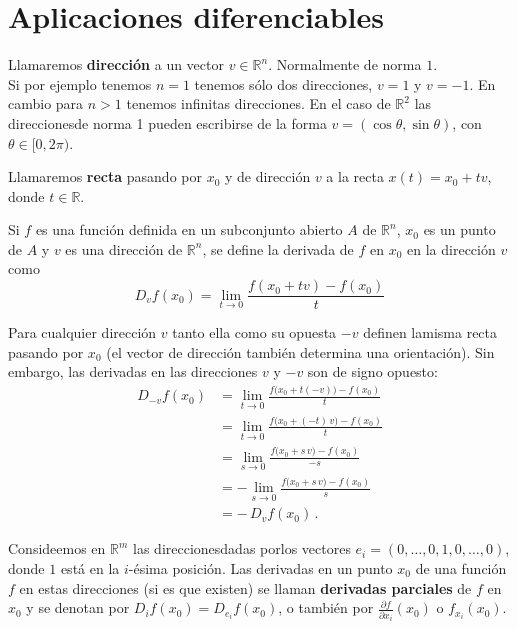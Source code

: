 \section{Aplicaciones diferenciables}
\begin{definición}[Dirección]
    Llamaremos \textbf{dirección} a un vector $v\in\mathbb{R}^n$. Normalmente de norma $1$. \\
    Si por ejemplo tenemos $n = 1$ tenemos sólo dos direcciones, $v = 1$ y $v = -1$. En cambio para $n > 1$ tenemos infinitas direcciones. En el caso de $\mathbb{R}^2$ las direccionesde norma 1 pueden escribirse de la forma $v = (\cos\theta, \sin\theta)$, con $\theta\in[0,2\pi)$. \\
\end{definición}

\begin{definición}[Recta]
    Llamaremos \textbf{recta} pasando por $x_0$ y de dirección $v$ a la recta $x(t) = x_0 + tv$, donde $t\in\mathbb{R}$. 
\end{definición}

\begin{definición}
    Si $f$ es una función definida en un subconjunto abierto $A$ de $\mathbb{R}^n$, $x_0$ es un punto de $A$ y $v$ es una dirección de $\mathbb{R}^n$, se define la derivada de $f$ en $x_0$ en la dirección $v$ como
    $$ D_vf(x_0) = \lim_{t\to 0} \frac{f(x_0 + tv) - f(x_0)}{t} $$
\end{definición}
\begin{observación}
    Para cualquier dirección $v$ tanto ella como su opuesta $-v$ definen lamisma recta pasando por $x_0$ (el vector de dirección también determina una orientación). Sin embargo, las derivadas en las direcciones $v$ y $-v$ son de signo opuesto: 
    \begin{align*}
        D_{-v}f(x_{0})
        &= \lim_{t \to 0} \frac{f\bigl(x_{0} + t(-v)\bigr) - f(x_{0})}{t} \\
        &= \lim_{t \to 0} \frac{f\bigl(x_{0} + (-t)\,v\bigr) - f(x_{0})}{t} \\
        &= \lim_{s \to 0} \frac{f\bigl(x_{0} + s\,v\bigr) - f(x_{0})}{-s} \\
        &= - \lim_{s \to 0} \frac{f\bigl(x_{0} + s\,v\bigr) - f(x_{0})}{s} \\
        &= -\,D_{v}f(x_{0}) \,.
    \end{align*}
\end{observación}

\begin{definición}
    Consideemos en $\mathbb{R}^m$ las direccionesdadas porlos vectores $e_i = (0,\ldots,0,1,0,\ldots,0)$, donde $1$ está en la $i$-ésima posición. 
    Las derivadas en un punto $x_0$ de una función $f$ en estas direcciones (si es que existen) se llaman \textbf{derivadas parciales} de $f$ en $x_0$ y se denotan por $D_if(x_0) = D_{e_i}f(x_0)$, o también por $\frac{\partial f}{\partial x_i}(x_0)$ o $f_{x_i}(x_0)$. 
\end{definición}

